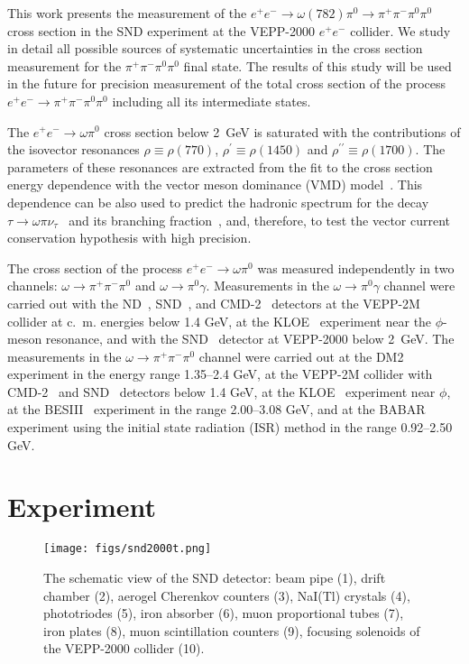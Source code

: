 \documentclass[twocolumn,aps,prd,floatfix,nofootinbib,superscriptaddress]{revtex4-2}
\begin{document}
This work presents the measurement of the \( e^+e^- \to \omega(782)\pi^0 \to \pi^+\pi^-\pi^0\pi^0 \) cross section in the SND experiment at the VEPP-2000 $e ^+e^-$ collider.
We study in detail all possible sources of systematic uncertainties in the cross section measurement for the $\pi^+\pi^-\pi^0\pi^0$ final state.
The results of this study will be used in the future for precision measurement of the total cross section of the process \(e^+e^- \to\pi^+\pi^-\pi^0\pi^0 \) including all its intermediate states.

The \( e^+e^- \to \omega\pi^0 \) cross section below 2~GeV is saturated with the contributions of the isovector resonances $\rho\equiv\rho(770)$, $\rho^\prime\equiv\rho(1450)$ and $\rho^{\prime\prime}\equiv\rho(1700)$.
The parameters of these resonances are extracted from the fit to the cross section energy dependence with the vector meson dominance (VMD) model~\cite{snd2016}.
This dependence can be also used to predict the hadronic spectrum for the decay \( \tau \to \omega\pi\nu_\tau \)~\cite{CLEO} and its branching fraction~\cite{snd2016}, and, therefore, to test the vector current conservation hypothesis with high precision.

The cross section of the process \( e^+e^- \to \omega\pi^0 \) was measured independently in two channels: \( \omega \to \pi^+\pi^-\pi^0 \) and \( \omega \to \pi^0\gamma \).
Measurements in the \( \omega \to \pi^0\gamma \) channel were carried out with the ND~\cite{nd1986}, SND~\cite{snd2000b,snd2000a}, and CMD-2~\cite{cmd03} detectors at the VEPP-2M collider at c.~m. energies below 1.4 GeV, at the KLOE~\cite{kloe08} experiment near the $\phi$-meson resonance, and with the SND~\cite{snd2016} detector at VEPP-2000 below 2~GeV.
The measurements in the \( \omega \to \pi^+\pi^-\pi^0 \) channel were carried out at the DM2~\cite{dm2} experiment in the energy range 1.35--2.4 GeV, at the VEPP-2M collider with CMD-2~\cite{cmd99} and SND~\cite{snd2000b,snd2003,snd2009} detectors below 1.4 GeV, at the KLOE~\cite{kloe08} experiment near $\phi$, at the BESIII~\cite{bes2021} experiment in the range 2.00--3.08 GeV, and at the BABAR~\cite{babar17} experiment using the initial state radiation (ISR) method in the range 0.92--2.50 GeV.

\section{Experiment}
\label{sec2}

\begin{figure*}
\centering
\texttt{[image: figs/snd2000t.png]}
\caption{
	The schematic view of the SND detector: beam pipe (1), drift chamber (2), aerogel Cherenkov counters (3), NaI(Tl) crystals (4), phototriodes (5), iron absorber (6), muon proportional tubes (7), iron plates (8), muon scintillation counters (9), focusing solenoids of the VEPP-2000 collider (10).
}
\label{fig:sndscheme}
\end{figure*}
\end{document}
